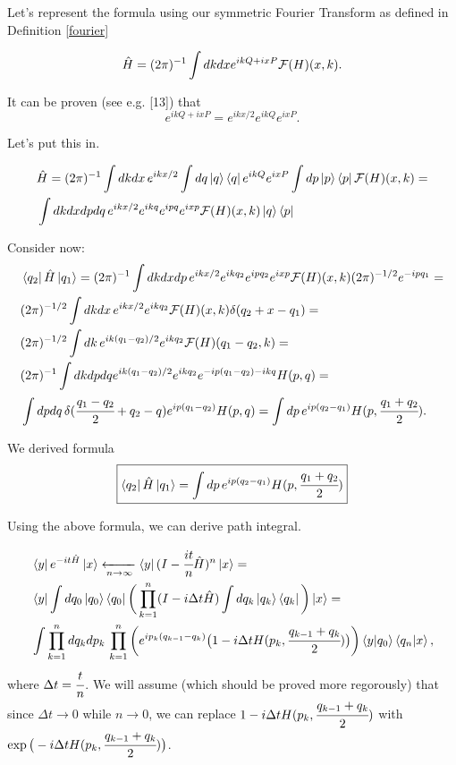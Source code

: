 \documentclass[main.tex]{subfiles}
\begin{document}
Let's represent the formula using our symmetric Fourier Transform as defined in Definition \ref{fourier}

\begin{equation}
\hat{H} = (2\pi)^{-1}\int dk dx e^{ikQ + ixP} \mathcal{F}(H)(x, k).
\end{equation}

It can be proven (see e.g. \cite{hall2013}[13]) that
\begin{equation}
e^{ikQ + ixP} = e^{ikx/2}e^{ikQ}e^{ixP}.
\end{equation}

Let's put this in.

\begin{align*}
& \hat{H} = (2\pi)^{-1}\int dk dx\, e^{ikx/2} \int dq \ket{q}\bra{q} e^{ikQ}e^{ixP} \int dp \ket{p}\bra{p}  \mathcal{F}(H)(x, k) = \\
& \int dk dx dp dq\,  e^{ikx/2} e^{ikq} e^{ipq} e^{ixp} \mathcal{F}(H)(x, k) \ket{q}\bra{p}
\end{align*}

Consider now:
\begin{align*}
& \bra{q_2} \hat{H} \ket{q_1} = (2\pi)^{-1} \int dk dx dp\,  e^{ikx/2} e^{ikq_2} e^{ipq_2} e^{ixp} \mathcal{F}(H)(x, k) (2\pi)^{-1/2}e^{-ipq_1} = \\
& (2\pi)^{-1/2} \int dk dx\,  e^{ikx/2} e^{ikq_2} \mathcal{F}(H)(x, k)
\delta(q_2 + x - q_1) = \\ 
& (2\pi)^{-1/2} \int dk \, e^{ik(q_1 - q_2)/2} e^{ikq_2} \mathcal{F}(H)(q_1 - q_2, k) = \\
& (2\pi)^{-1}  \int dk dp dq e^{ik(q_1 - q_2)/2} e^{ikq_2} e^{-ip(q_1 - q_2) -ikq} H(p, q) = \\
& \int dp dq\, \delta(\cfrac{q_1 - q_2}{2} + q_2 - q) e^{ip(q_1 - q_2)} H(p, q) = 
\int dp\, e^{ip(q_2 - q_1)} H(p, \cfrac{q_1 + q_2}{2}).
\end{align*}

We derived formula
\begin{equation}
\boxed{
\bra{q_2} \hat{H} \ket{q_1} = \int dp\, e^{ip(q_2 - q_1)} H(p, \cfrac{q_1 + q_2}{2})
}
\end{equation}

Using the above formula, we can derive path integral.

\begin{align*}
& \bra{y}e^{-it\hat{H}}\ket{x} \xleftarrow[n \to \infty]{} \bra{y}(I - \cfrac{it}{n}\hat{H})^n\ket{x} = \\
& \bra{y}\int dq_0 
\ket{q_0} \bra{q_0} \bigg( \prod_{k=1}^n  (I - i\Delta t\hat{H}) \int dq_k 
\ket{q_k} \bra{q_k}\bigg)\ket{x} = \\
& \int \prod_{k=1}^n dq_k dp_k\, \prod_{k=1}^n \bigg( e^{ip_k(q_{k-1} - q_k)} \big( 1 - i\Delta tH(p_k, \cfrac{q_{k-1} + q_k}{2})\big)\bigg) 
\bra{y}\ket{q_0}\bra{q_n}\ket{x},
\end{align*}
where $\Delta t = \cfrac{t}{n}$. We will assume (which should be proved more regorously) that since $\Delta t \to 0$ while $n\to 0$, we can replace  $1 - i\Delta tH(p_k, \cfrac{q_{k-1} + q_k}{2})$ with $\exp\big(-i\Delta t H(p_k, \cfrac{q_{k-1} + q_k}{2})\big)$.
\end{document}
